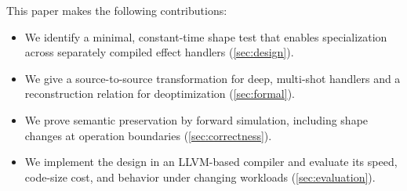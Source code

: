 This paper makes the following contributions:

\begin{itemize}
  \item We identify a minimal, constant-time shape test that enables
        specialization across separately compiled effect handlers
        (\cref{sec:design}).
  \item We give a source-to-source transformation for deep, multi-shot handlers
        and a reconstruction relation for deoptimization (\cref{sec:formal}).
  \item We prove semantic preservation by forward simulation, including shape
        changes at operation boundaries (\cref{sec:correctness}).
  \item We implement the design in an LLVM-based compiler and evaluate its
        speed, code-size cost, and behavior under changing workloads
        (\cref{sec:evaluation}).
\end{itemize}
